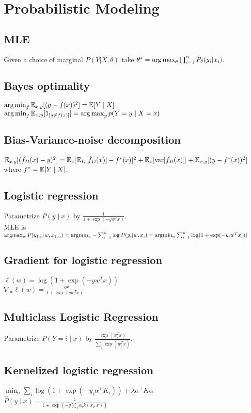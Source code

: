 \section*{Probabilistic Modeling}
\subsection*{MLE}
Given a choice of marginal $P(Y|X,\theta)$ take 
$\theta^* =\operatorname*{arg\,max}_\theta \prod_{i=1}^n {P_\theta}(y_i|x_i).$

\subsection*{Bayes optimality}
$\operatorname*{arg\,min}_f\mathbb{E}_{x,y}[(y-f(x))^2]=\mathbb{E}[Y\mid X]$\\
$\operatorname*{arg\,min}_f\mathbb{E}_{x,y}[1_{[y\neq f(x)]}]\\=\operatorname*{arg\,max}_yp(Y=y\mid X=x)$

\subsection*{Bias-Variance-noise decomposition}
$\mathbb{E}_{x,y}[(\hat{f}_D(x)- y)^2]\\=
\mathbb{E}_x[\mathbb{E}_D[\hat{f}_D(x)]-f^*(x)]^2\\
\hspace*{0.1mm}+\mathbb{E}_x[\operatorname{var}[\hat{f}_D(x)]]\\
\hspace*{0.1mm}+\mathbb{E}_{x,y}[(y-f^*(x))^2]$ where $f^*=\mathbb{E}[Y\mid X]$.


\subsection*{Logistic regression}
Parametrize $P(y\mid x)$ by $\frac{1}{1+\exp(-y w^T x)}$.\\
MLE is $\operatorname{argmax_w} P(y_{1:n}|w,x_{1:n})\\
= \operatorname{argmin_w} - \sum_{i=1}^n \log P(y_i|w,x_i)\\
= \operatorname{argmin_w} \sum_{i=1}^n \log(1+\exp(-y_i w^T x_i))$

\subsection*{Gradient for logistic regression}
$\ell(w) = \log(1+\exp(-yw^Tx))$\\
$\nabla_w \ell(w) =\frac{-yx}{1+\exp(yw^Tx)}$

\subsection*{Multiclass Logistic Regression}
Parametrize $P(Y=i\mid x)$ by $\frac{\exp(w_i^Tx)}{\sum_j \exp(w_j^Tx)}$.

\subsection*{Kernelized logistic regression}
\mbox{$\min_\alpha\sum_i\log(1+\exp(-y_i\alpha^\top K_i)) + \lambda\alpha^\top K \alpha$}
$\hat{P}(y\mid x)=\frac{1}{1+\exp(-y\sum_i\alpha_ik(x_i,x))}$
\\